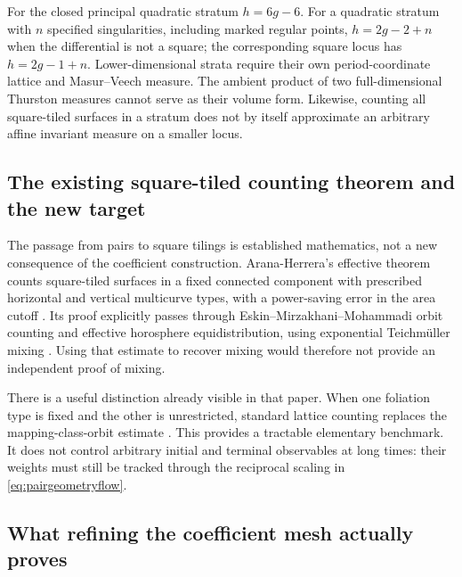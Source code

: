 For the closed principal quadratic stratum $h=6g-6$.  For a
quadratic stratum with $n$ specified singularities, including marked
regular points, $h=2g-2+n$ when the differential is not a square;
the corresponding square locus has $h=2g-1+n$.
Lower-dimensional strata require their own period-coordinate lattice
and Masur--Veech measure.  The ambient product of two full-dimensional
Thurston measures cannot serve as their volume form.  Likewise,
counting all square-tiled surfaces in a stratum does not by itself
approximate an arbitrary affine invariant measure on a smaller locus.

\subsection{The existing square-tiled counting theorem and the new target}
\label{subsec:pairliterature}

The passage from pairs to square tilings is established mathematics,
not a new consequence of the coefficient construction.
Arana-Herrera's effective theorem counts square-tiled surfaces in a
fixed connected component with prescribed horizontal and vertical
multicurve types, with a power-saving error in the area cutoff
\cite[Theorem~1.1]{AranaHerreraSquareEffective}.  Its proof explicitly
passes through Eskin--Mirzakhani--Mohammadi orbit counting and effective
horosphere equidistribution, using exponential Teichm\"uller mixing
\cite[Theorem~3.2 and its proof]{AranaHerreraSquareEffective}.
Using that estimate to recover mixing would therefore not provide an
independent proof of mixing.

There is a useful distinction already visible in that paper.
When one foliation type is fixed and the other is unrestricted,
standard lattice counting replaces the mapping-class-orbit estimate
\cite[Theorem~3.9]{AranaHerreraSquareEffective}.
This provides a tractable elementary benchmark.  It does not control
arbitrary initial and terminal observables at long times: their weights
must still be tracked through the reciprocal scaling in
\eqref{eq:pairgeometryflow}.


\subsection{What refining the coefficient mesh actually proves}

